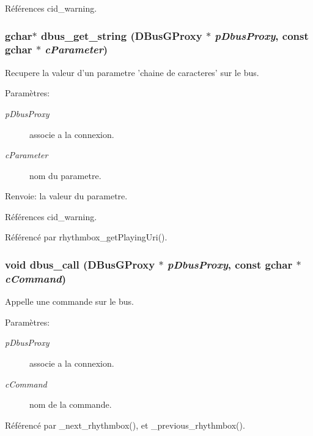 Références cid\_\-warning.
\subsubsection{\setlength{\rightskip}{0pt plus 5cm}gchar$\ast$ dbus\_\-get\_\-string (DBusGProxy $\ast$ {\em pDbusProxy}, \/  const gchar $\ast$ {\em cParameter})}\label{cid-dbus_8c_4bcef2ba58371bec044bbe2c319a9101}


Recupere la valeur d'un parametre 'chaine de caracteres' sur le bus. \begin{Desc}
\item[Paramètres:]
\begin{description}
\item[{\em pDbusProxy}]associe a la connexion. \item[{\em cParameter}]nom du parametre. \end{description}
\end{Desc}
\begin{Desc}
\item[Renvoie:]la valeur du parametre. \end{Desc}


Références cid\_\-warning.

Référencé par rhythmbox\_\-getPlayingUri().
\subsubsection{\setlength{\rightskip}{0pt plus 5cm}void dbus\_\-call (DBusGProxy $\ast$ {\em pDbusProxy}, \/  const gchar $\ast$ {\em cCommand})}\label{cid-dbus_8c_9c0feee625a42e23e7882823c9194123}


Appelle une commande sur le bus. \begin{Desc}
\item[Paramètres:]
\begin{description}
\item[{\em pDbusProxy}]associe a la connexion. \item[{\em cCommand}]nom de la commande. \end{description}
\end{Desc}


Référencé par \_\-next\_\-rhythmbox(), et \_\-previous\_\-rhythmbox().
